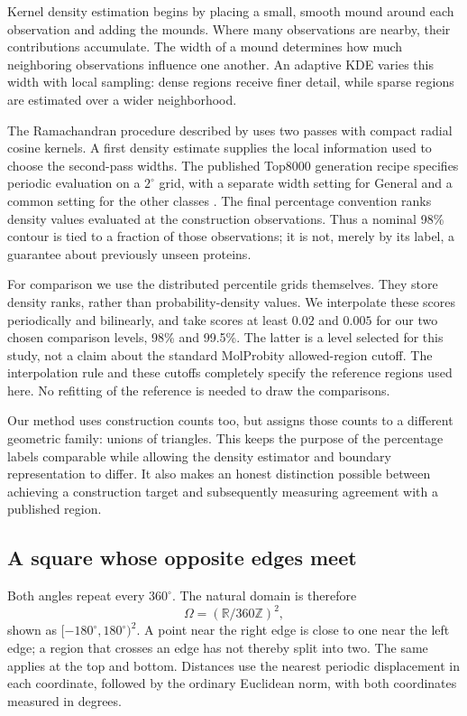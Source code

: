 \documentclass[11pt]{article}
\newcommand{\R}{\mathbb{R}}
\newcommand{\Z}{\mathbb{Z}}
\begin{document}
Kernel density estimation begins by placing a small, smooth mound around
each observation and adding the mounds. Where many observations are nearby,
their contributions accumulate. The width of a mound determines how much
neighboring observations influence one another. An adaptive KDE varies this
width with local sampling: dense regions receive finer detail, while sparse
regions are estimated over a wider neighborhood.

The Ramachandran procedure described by \citet{lovell2003} uses two passes
with compact radial cosine kernels. A first density estimate supplies the
local information used to choose the second-pass widths. The published
Top8000 generation recipe specifies periodic evaluation on a $2^\circ$ grid,
with a separate width setting for General and a common setting for the other
classes \citep{top8000recipe}. The final percentage convention ranks density
values evaluated at the construction observations. Thus a nominal 98\%
contour is tied to a fraction of those observations; it is not, merely by its
label, a guarantee about previously unseen proteins.

For comparison we use the distributed percentile grids themselves. They
store density ranks, rather than probability-density values. We interpolate
these scores periodically and bilinearly, and take scores at least $0.02$
and $0.005$ for our two chosen comparison levels, 98\% and 99.5\%. The latter
is a level selected for this study, not a claim about the standard MolProbity
allowed-region cutoff. The interpolation rule and these cutoffs completely
specify the reference regions used here. No refitting of the reference is
needed to draw the comparisons.

Our method uses construction counts too, but assigns those counts to a
different geometric family: unions of triangles. This keeps the purpose of
the percentage labels comparable while allowing the density estimator and
boundary representation to differ. It also makes an honest distinction
possible between achieving a construction target and subsequently measuring
agreement with a published region.

\subsection{A square whose opposite edges meet}

Both angles repeat every $360^\circ$. The natural domain is therefore
\[
  \Omega=(\R/360\Z)^2,
\]
shown as $[-180^\circ,180^\circ)^2$. A point near the right edge is close to
one near the left edge; a region that crosses an edge has not thereby split
into two. The same applies at the top and bottom. Distances use the nearest
periodic displacement in each coordinate, followed by the ordinary Euclidean
norm, with both coordinates measured in degrees.
\end{document}
